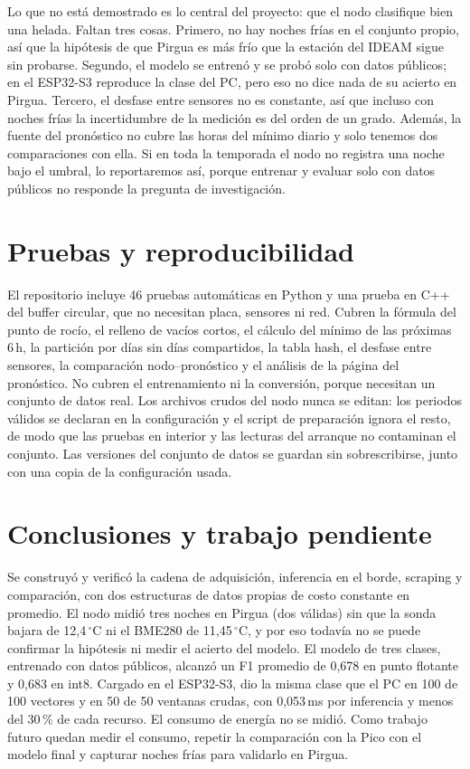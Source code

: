 \documentclass[conference]{IEEEtran}
\begin{document}
Lo que no est\'a demostrado es lo central del proyecto: que el nodo clasifique bien una helada. Faltan tres cosas. Primero, no hay noches fr\'ias en el conjunto propio, as\'i que la hip\'otesis de que Pirgua es m\'as fr\'io que la estaci\'on del IDEAM sigue sin probarse. Segundo, el modelo se entren\'o y se prob\'o solo con datos p\'ublicos; en el ESP32-S3 reproduce la clase del PC, pero eso no dice nada de su acierto en Pirgua. Tercero, el desfase entre sensores no es constante, as\'i que incluso con noches fr\'ias la incertidumbre de la medici\'on es del orden de un grado. Adem\'as, la fuente del pron\'ostico no cubre las horas del m\'inimo diario y solo tenemos dos comparaciones con ella. Si en toda la temporada el nodo no registra una noche bajo el umbral, lo reportaremos as\'i, porque entrenar y evaluar solo con datos p\'ublicos no responde la pregunta de investigaci\'on.

\section{Pruebas y reproducibilidad}
El repositorio incluye 46 pruebas autom\'aticas en Python y una prueba en C++ del buffer circular, que no necesitan placa, sensores ni red. Cubren la f\'ormula del punto de roc\'io, el relleno de vac\'ios cortos, el c\'alculo del m\'inimo de las pr\'oximas 6\,h, la partici\'on por d\'ias sin d\'ias compartidos, la tabla hash, el desfase entre sensores, la comparaci\'on nodo--pron\'ostico y el an\'alisis de la p\'agina del pron\'ostico. No cubren el entrenamiento ni la conversi\'on, porque necesitan un conjunto de datos real. Los archivos crudos del nodo nunca se editan: los periodos v\'alidos se declaran en la configuraci\'on y el script de preparaci\'on ignora el resto, de modo que las pruebas en interior y las lecturas del arranque no contaminan el conjunto. Las versiones del conjunto de datos se guardan sin sobrescribirse, junto con una copia de la configuraci\'on usada.

\section{Conclusiones y trabajo pendiente}
Se construy\'o y verific\'o la cadena de adquisici\'on, inferencia en el borde, scraping y comparaci\'on, con dos estructuras de datos propias de costo constante en promedio. El nodo midi\'o tres noches en Pirgua (dos v\'alidas) sin que la sonda bajara de 12,4\,$^\circ$C ni el BME280 de 11,45\,$^\circ$C, y por eso todav\'ia no se puede confirmar la hip\'otesis ni medir el acierto del modelo. El modelo de tres clases, entrenado con datos p\'ublicos, alcanz\'o un F1 promedio de 0,678 en punto flotante y 0,683 en int8. Cargado en el ESP32-S3, dio la misma clase que el PC en 100 de 100 vectores y en 50 de 50 ventanas crudas, con 0,053\,ms por inferencia y menos del 30\,\% de cada recurso. El consumo de energ\'ia no se midi\'o. Como trabajo futuro quedan medir el consumo, repetir la comparaci\'on con la Pico con el modelo final y capturar noches fr\'ias para validarlo en Pirgua.
\end{document}
